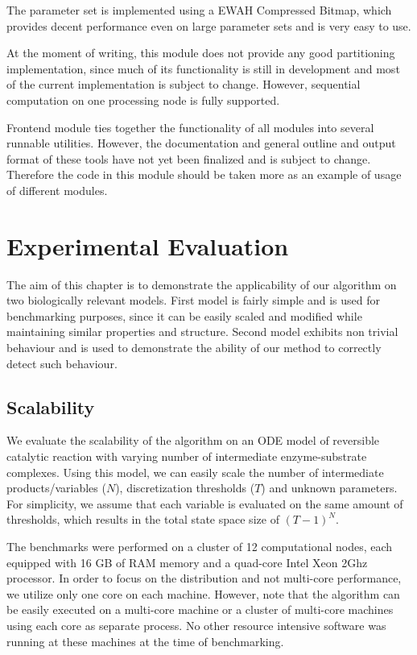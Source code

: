 \documentclass[12pt,oneside]{fithesis2}
\begin{document}
			The parameter set is implemented using a EWAH Compressed Bitmap, which provides decent performance even on large parameter sets and is very easy to use. 
				
			At the moment of writing, this module does not provide any good partitioning implementation, since much of its functionality is still in development and most of the current implementation is subject to change. However, sequential computation on one processing node is fully supported.					
			
			Frontend module ties together the functionality of all modules into several runnable utilities. However, the documentation and general outline and output format of these tools have not yet been finalized and is subject to change. Therefore the code in this module should be taken more as an example of usage of different modules.	
				
	\chapter{Experimental Evaluation}

			The aim of this chapter is to demonstrate the applicability of our algorithm on two biologically relevant models. First model is fairly simple and is used for benchmarking purposes, since it can be easily scaled and modified while maintaining similar properties and structure. Second model exhibits non trivial behaviour and is used to demonstrate the ability of our method to correctly detect such behaviour. 
		
			\section{Scalability}	
				\label{sec:scale}
			
				We evaluate the scalability of the algorithm on an ODE model of reversible catalytic reaction with varying number of intermediate enzyme-substrate complexes.  Using this model, we can easily scale the number of intermediate products/variables ($N$), discretization thresholds ($T$) and unknown parameters. For simplicity, we assume that each variable is evaluated on the same amount of thresholds, which results in the total state space size of $(T - 1)^N$. 
				
				
				The benchmarks were performed on a cluster of 12 computational nodes, each equipped with 16 GB of RAM memory and a quad-core Intel Xeon 2Ghz processor. In order to focus on the distribution and not multi-core performance, we utilize only one core on each machine. However, note that the algorithm can be easily executed on a multi-core machine or a cluster of multi-core machines using each core as separate process. No other resource intensive software was running at these machines at the time of benchmarking.
				
\end{document}
